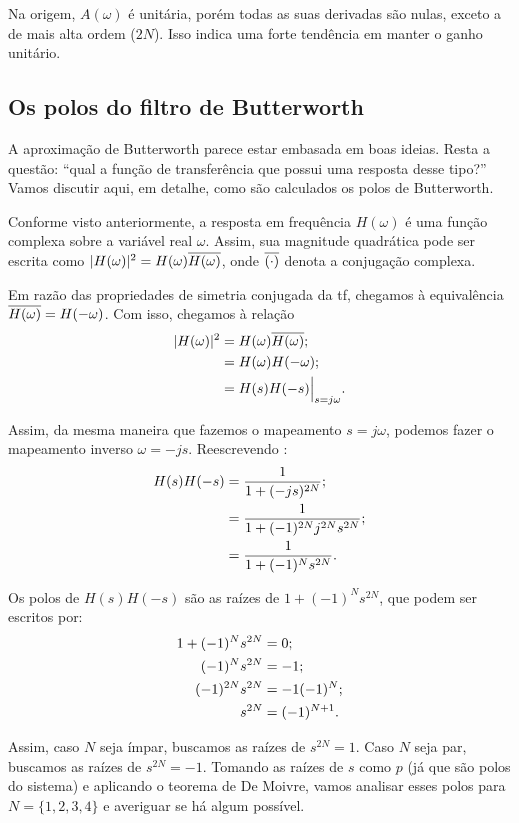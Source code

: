Na origem, $A(\omega)$ é unitária, porém todas as suas derivadas são nulas, exceto a de mais alta ordem ($2N$). Isso indica uma forte tendência em manter o ganho unitário.

\subsection{Os polos do filtro de Butterworth}

A aproximação de Butterworth parece estar embasada em boas ideias. Resta a questão: \enquote{qual a função de transferência que possui uma resposta desse tipo?} Vamos discutir aqui, em detalhe, como são calculados os polos de Butterworth.

Conforme visto anteriormente, a resposta em frequência $H(\omega)$ é uma função complexa sobre a variável real $\omega$. Assim, sua magnitude quadrática pode ser escrita como $|H(\omega)|^2=H(\omega)\overline{H(\omega)}$, onde $\overline{(\cdot)}$ denota a conjugação complexa.

Em razão das propriedades de simetria conjugada da \ac{tf}, chegamos à equivalência $\overline{H(\omega)}=H(-\omega)$. Com isso, chegamos à relação
\begin{align*}
	|H(\omega)|^2&=H(\omega)\overline{H(\omega)};\\
	&=H(\omega)H(-\omega);\\
	&=H(s)H(-s)\Big|_{s=j\omega}.
\end{align*}

Assim, da mesma maneira que fazemos o mapeamento $s=j\omega$, podemos fazer o mapeamento inverso $\omega=-js$. Reescrevendo :
\begin{align}
	H(s)H(-s)&=\frac{1}{1+(-js)^{2N}};\notag\\
			 &=\frac{1}{1+(-1)^{2N}j^{2N}s^{2N}};\notag\\
			 &=\frac{1}{1+(-1)^Ns^{2N}}.
\end{align}

Os polos de $H(s)H(-s)$ são as raízes de $1+(-1)^Ns^{2N}$, que podem ser escritos por:
\begin{align}
	1+(-1)^Ns^{2N}&=0;\notag\\
	(-1)^Ns^{2N}&=-1;\notag\\
	(-1)^{2N}s^{2N}&=-1(-1)^N;\notag\\
	s^{2N}&=(-1)^{N+1}.
\end{align}

Assim, caso $N$ seja ímpar, buscamos as raízes de $s^{2N}=1$. Caso $N$ seja par, buscamos as raízes de $s^{2N}=-1$. Tomando as raízes de $s$ como $p$ (já que são polos do sistema) e aplicando o teorema de De Moivre, vamos analisar esses polos para $N=\{1,2,3,4\}$ e averiguar se há algum  possível.

